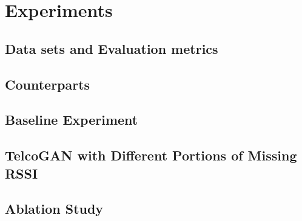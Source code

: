 \section{Experiments}

\subsection{Data sets and Evaluation metrics}

\subsection{Counterparts}

\subsection{Baseline Experiment}

\subsection{TelcoGAN with Different Portions of Missing RSSI}

\subsection{Ablation Study}

